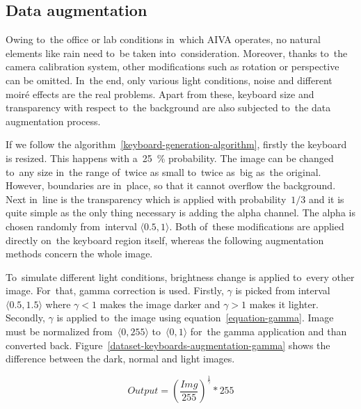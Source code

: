 \subsection{Data augmentation}
\label{dataset-keyboards-augmentation}
Owing to~the office or lab conditions in~which AIVA operates, no natural elements like rain need to~be taken into~consideration. Moreover, thanks to~the camera calibration system, other modifications such as rotation or perspective can be omitted. In~the end, only various light conditions, noise and different moiré effects are the real problems. Apart from these, keyboard size and transparency with respect to~the background are also subjected to~the data augmentation process.

If we follow the algorithm~\ref{keyboard-generation-algorithm}, firstly the keyboard is resized. This happens with a~25~\% probability. The image can be changed to~any size in~the range of~twice as small to~twice as~big as~the original. However, boundaries are in~place, so that it cannot overflow the background. Next in~line is the transparency which is applied with probability~\(1/3\) and it is quite simple as the only thing necessary is adding the alpha channel. The alpha is chosen randomly from~interval \(\langle0.5, 1\rangle\). Both of~these modifications are applied directly on~the keyboard region itself, whereas the following augmentation methods concern the whole image.

To~simulate different light conditions, brightness change is applied to~every other image. For~that, gamma correction is used. Firstly, \(\gamma\) is picked from interval \(\langle0.5, 1.5\rangle\) where \(\gamma < 1\) makes the image darker and \(\gamma > 1\) makes it lighter. Secondly, \(\gamma\) is applied to~the image using equation~\ref{equation-gamma}. Image must be normalized from~\(\langle0, 255\rangle\) to~\(\langle0, 1\rangle\) for~the gamma application and than converted back. Figure~\ref{dataset-keyboards-augmentation-gamma} shows the difference between the dark, normal and light images.

\begin{equation}
  \label{equation-gamma}
  Output = \left(\frac{Img}{255}\right)^\frac{1}{\gamma} * 255
\end{equation}

